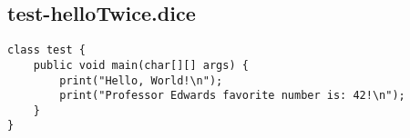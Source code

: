 \subsection{test-helloTwice.dice}
\begin{verbatim}
class test {
	public void main(char[][] args) {
		print("Hello, World!\n");
		print("Professor Edwards favorite number is: 42!\n");
	}
}
\end{verbatim}